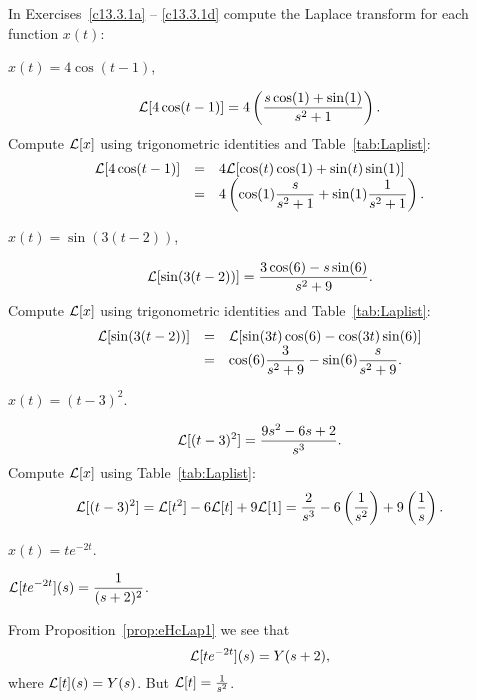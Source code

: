 \documentclass{ximera}
\begin{document}
\TEXER

\noindent In Exercises~\ref{c13.3.1a} -- \ref{c13.3.1d} compute the Laplace 
transform for each function $x(t)$:
\begin{exercise} \label{c13.3.1a}
$x(t) = 4\cos(t-1)$,

\begin{solution}
\ans
\[
{\cal L}[4\cos(t - 1)] =
4\left(\frac{s\cos(1) + \sin(1)}{s^2 + 1}\right).
\]
\soln Compute ${\cal L}[x]$ using trigonometric identities and
Table~\ref{tab:Laplist}:
\[
\begin{array}{rcl}
{\cal L}[4\cos(t - 1)]
& = & 4{\cal L}[\cos(t)\cos(1) + \sin(t)\sin(1)] \\
& = & \displaystyle 4\left(\cos(1)\frac{s}{s^2 + 1} + \sin(1)\frac{1}{s^2 + 1}\right).
\end{array}
\]

\end{solution}
\end{exercise}
\begin{exercise} \label{c13.3.1b}
$x(t) = \sin(3(t-2))$,

\begin{solution}
\ans
\[
{\cal L}[\sin(3(t - 2))] = 
\frac{3\cos(6) - s\sin(6)}{s^2 + 9}.
\]
\soln Compute ${\cal L}[x]$ using trigonometric identities and
Table~\ref{tab:Laplist}:
\[
\begin{array}{rcl}
{\cal L}[\sin(3(t - 2))]
& = & {\cal L}[\sin(3t)\cos(6) - \cos(3t)\sin(6)] \\
& = & \displaystyle \cos(6)\frac{3}{s^2 + 9} - \sin(6)\frac{s}{s^2 + 9}.
\end{array}
\]

\end{solution}
\end{exercise}
\begin{exercise} \label{c13.3.1c}
$x(t) = (t-3)^2$.

\begin{solution}
\ans
\[
{\cal L}[(t - 3)^2] = \frac{9s^2 - 6s + 2}{s^3}.
\]
\soln Compute ${\cal L}[x]$ using Table~\ref{tab:Laplist}:
\[
{\cal L}[(t - 3)^2] = {\cal L}[t^2] - 6{\cal L}[t] + 9{\cal L}[1]
= \frac{2}{s^3} - 6\left(\frac{1}{s^2}\right) + 9\left(\frac{1}{s}
\right).
\]


\end{solution}
\end{exercise}
\begin{exercise} \label{c13.3.1d}
$x(t) = te^{-2t}$.

\begin{solution}
\ans $\displaystyle {\cal L}[te^{-2t}](s)=\frac{1}{(s+2)^2}$.

\soln  From Proposition~\ref{prop:eHcLap1} we see that
\[
{\cal L}[te^{-2t}](s) = Y(s+2),
\]
where ${\cal L}[t](s) = Y(s)$.  But ${\cal L}[t] = \frac{1}{s^2}$.

\end{solution}
\end{exercise}
\end{document}
